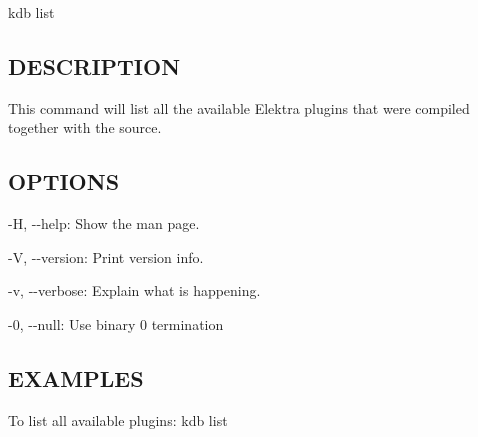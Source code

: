 {\ttfamily kdb list}

\subsection*{D\+E\+S\+C\+R\+I\+P\+T\+I\+O\+N}

This command will list all the available Elektra plugins that were compiled together with the source.

\subsection*{O\+P\+T\+I\+O\+N\+S}


\begin{DoxyItemize}
\item {\ttfamily -\/\+H}, {\ttfamily -\/-\/help}\+: Show the man page.
\item {\ttfamily -\/\+V}, {\ttfamily -\/-\/version}\+: Print version info.
\item {\ttfamily -\/v}, {\ttfamily -\/-\/verbose}\+: Explain what is happening.
\item {\ttfamily -\/0}, {\ttfamily -\/-\/null}\+: Use binary 0 termination
\end{DoxyItemize}

\subsection*{E\+X\+A\+M\+P\+L\+E\+S}

To list all available plugins\+: {\ttfamily kdb list} 
